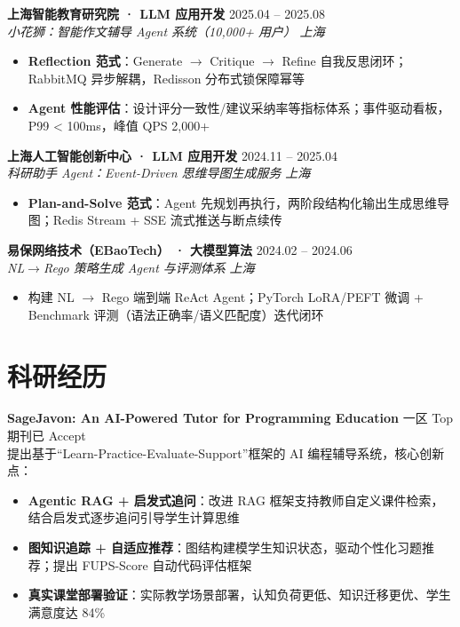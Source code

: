 \documentclass[10pt,a4paper]{article}
\newcommand{\expentry}[4]{%
  \noindent\textbf{#1} \hfill #4 \\[-3pt]
  \textit{#3} \hfill \textit{#2} \vspace{0pt}
}
\begin{document}
\vspace{1pt}

\expentry{上海智能教育研究院 · LLM 应用开发}{上海}{小花狮：智能作文辅导 Agent 系统（10,000+ 用户）}{2025.04 -- 2025.08}
\begin{itemize}
  \item \textbf{Reflection 范式}：Generate $\to$ Critique $\to$ Refine 自我反思闭环；RabbitMQ 异步解耦，Redisson 分布式锁保障幂等
  \item \textbf{Agent 性能评估}：设计评分一致性/建议采纳率等指标体系；事件驱动看板，P99 < 100ms，峰值 QPS 2,000+
\end{itemize}

\vspace{1pt}

\expentry{上海人工智能创新中心 · LLM 应用开发}{上海}{科研助手 Agent：Event-Driven 思维导图生成服务}{2024.11 -- 2025.04}
\begin{itemize}
  \item \textbf{Plan-and-Solve 范式}：Agent 先规划再执行，两阶段结构化输出生成思维导图；Redis Stream + SSE 流式推送与断点续传
\end{itemize}

\vspace{1pt}

\expentry{易保网络技术（EBaoTech） · 大模型算法}{上海}{NL$\to$Rego 策略生成 Agent 与评测体系}{2024.02 -- 2024.06}
\begin{itemize}
  \item 构建 NL $\to$ Rego 端到端 ReAct Agent；PyTorch LoRA/PEFT 微调 + Benchmark 评测（语法正确率/语义匹配度）迭代闭环
\end{itemize}

\section{科研经历}

\noindent\textbf{SageJavon: An AI-Powered Tutor for Programming Education} \hfill 一区 Top 期刊已 Accept \\[2pt]
{\small 提出基于``Learn-Practice-Evaluate-Support''框架的 AI 编程辅导系统，核心创新点：}
\begin{itemize}
  \item \textbf{Agentic RAG + 启发式追问}：改进 RAG 框架支持教师自定义课件检索，结合启发式逐步追问引导学生计算思维
  \item \textbf{图知识追踪 + 自适应推荐}：图结构建模学生知识状态，驱动个性化习题推荐；提出 FUPS-Score 自动代码评估框架
  \item \textbf{真实课堂部署验证}：实际教学场景部署，认知负荷更低、知识迁移更优、学生满意度达 84\%
\end{itemize}
\end{document}
